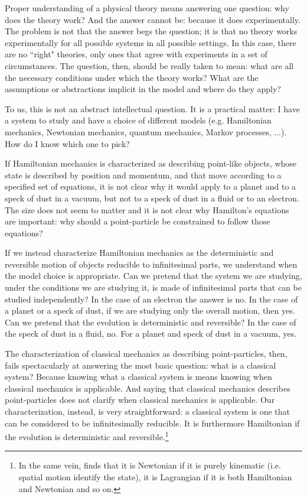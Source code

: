 \documentclass[11pt]{elsarticle}
\begin{document}
Proper understanding of a physical theory means answering one question: why does the theory work? And the answer cannot be: because it does experimentally. The problem is not that the answer begs the question; it is that no theory works experimentally for all possible systems in all possible settings. In this case, there are no ``right" theories, only ones that agree with experiments in a set of circumstances. The question, then, should be really taken to mean: what are all the necessary conditions under which the theory works? What are the assumptions or abstractions implicit in the model and where do they apply?

To us, this is not an abstract intellectual question. It is a practical matter: I have a system to study and have a choice of different models (e.g. Hamiltonian mechanics, Newtonian mechanics, quantum mechanics, Markov processes, ...). How do I know which one to pick?

If Hamiltonian mechanics is characterized as describing point-like objects, whose state is described by position and momentum, and that move according to a specified set of equations, it is not clear why it would apply to a planet and to a speck of dust in a vacuum, but not to a speck of dust in a fluid or to an electron. The size does not seem to matter and it is not clear why Hamilton's equations are important: why should a point-particle be constrained to follow those equations?

If we instead characterize Hamiltonian mechanics as the deterministic and reversible motion of objects reducible to infinitesimal parts, we understand when the model choice is appropriate. Can we pretend that the system we are studying, under the conditions we are studying it, is made of infinitesimal parts that can be studied independently? In the case of an electron the answer is no. In the case of a planet or a speck of dust, if we are studying only the overall motion, then yes. Can we pretend that the evolution is deterministic and reversible? In the case of the speck of dust in a fluid, no. For a planet and speck of dust in a vacuum, yes.

The characterization of classical mechanics as describing point-particles, then, fails spectacularly at answering the most basic question: what is a classical system? Because knowing what a classical system is means knowing when classical mechanics is applicable. And saying that classical mechanics describes point-particles does not clarify when classical mechanics is applicable. Our characterization, instead, is very straightforward: a classical system is one that can be considered to be infinitesimally reducible. It is furthermore Hamiltonian if the evolution is deterministic and reversible.\footnote{In the same vein, \cite{AoPPhy1} finds that it is Newtonian if it is purely kinematic (i.e. spatial motion identify the state), it is Lagrangian if it is both Hamiltonian and Newtonian and so on.}
\end{document}
